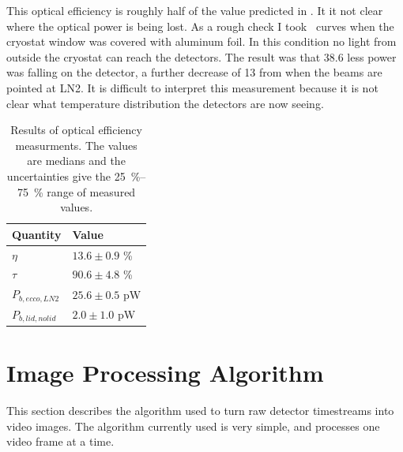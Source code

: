 This optical efficiency is roughly half of the value predicted in .
It it not clear where the optical power is being lost.
As a rough check I took \IV\ curves when the cryostat window was covered with aluminum foil.
In this condition no light from outside the cryostat can reach the detectors.
The result was that \SI{38.6}{\pW} less power was falling on the detector, a further decrease of \SI{13}{\pW} from when the beams are pointed at LN2.
It is difficult to interpret this measurement because it is not clear what temperature distribution the detectors are now seeing.

\begin{table}[t]
\centering
\caption{
Results of optical efficiency measurments.
The values are medians and the uncertainties give the \SIrange{25}{75}{\percent} range of measured values.
}
\label{tab:opt-eff}
\begin{tabular}{l l}
\toprule
Quantity &  Value \\
\midrule
$\eta$ & $13.6 \pm  0.9$ \% \\ 
$\tau$ & $90.6 \pm  4.8$ \% \\ 
$P_{b,ecco,LN2}$   & $25.6 \pm  0.5$ pW \\ 
$P_{b,lid,no lid}$ & $ 2.0 \pm  1.0$ pW \\
\bottomrule
\end{tabular}
\end{table}
 
\section{Image Processing Algorithm} \label{sec:ch8-algo}

This section describes the algorithm used to turn raw detector timestreams into video images.
The algorithm currently used is very simple, and processes one video frame at a time.

